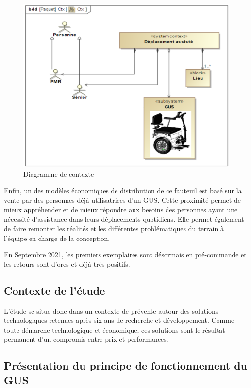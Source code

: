 \begin{figure}[ht!]
\centering\includegraphics[width=0.6\linewidth]{img/fig02.png}
\caption{\label{fig02} Diagramme de contexte}
\end{figure}

Enfin, un des modèles économiques de distribution de ce fauteuil est
basé sur la vente par des personnes déjà utilisatrices d'un GUS. Cette
proximité permet de mieux appréhender et de mieux répondre aux besoins des personnes ayant une nécessité d'assistance dans leurs déplacements quotidiens. Elle permet également de faire remonter les réalités et les différentes problématiques du terrain à l'équipe en charge de la conception.

En Septembre 2021, les premiers exemplaires sont désormais en pré-commande et les retours sont d'ores et déjà très positifs.

\subsection{Contexte de l'étude}

L'étude se situe donc dans un contexte de prévente autour des solutions technologiques retenues après six ans de recherche et développement. Comme toute démarche technologique et économique, ces solutions sont le résultat permanent d'un compromis entre prix et performances.

\subsection{Présentation du principe de fonctionnement du GUS}

